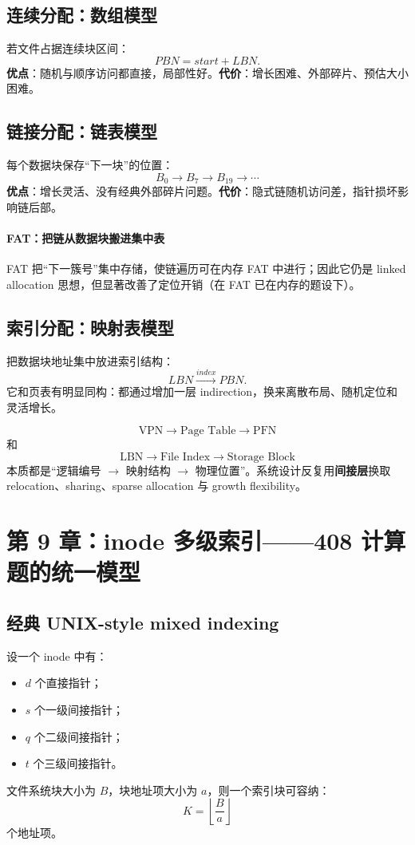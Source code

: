 \documentclass[11pt,a4paper]{ctexart}
\newcommand{\kw}[1]{\textbf{#1}}
\begin{document}
\subsection{连续分配：数组模型}
若文件占据连续块区间：
\[
PBN = start + LBN.
\]
\kw{优点}：随机与顺序访问都直接，局部性好。\kw{代价}：增长困难、外部碎片、预估大小困难。

\subsection{链接分配：链表模型}
每个数据块保存“下一块”的位置：
\[
B_0\to B_7\to B_{19}\to\cdots
\]
\kw{优点}：增长灵活、没有经典外部碎片问题。\kw{代价}：隐式链随机访问差，指针损坏影响链后部。

\paragraph{FAT：把链从数据块搬进集中表}
FAT 把“下一簇号”集中存储，使链遍历可在内存 FAT 中进行；因此它仍是 linked allocation 思想，但显著改善了定位开销（在 FAT 已在内存的题设下）。

\subsection{索引分配：映射表模型}
把数据块地址集中放进索引结构：
\[
LBN\xrightarrow{index}PBN.
\]
它和页表有明显同构：都通过增加一层 indirection，换来离散布局、随机定位和灵活增长。

\begin{bridge}
\[
\text{VPN}\to\text{Page Table}\to\text{PFN}
\]
和
\[
\text{LBN}\to\text{File Index}\to\text{Storage Block}
\]
本质都是“逻辑编号 $\to$ 映射结构 $\to$ 物理位置”。系统设计反复用\kw{间接层}换取 relocation、sharing、sparse allocation 与 growth flexibility。
\end{bridge}

\section{第 9 章：inode 多级索引——408 计算题的统一模型}

\subsection{经典 UNIX-style mixed indexing}
设一个 inode 中有：
\begin{itemize}
  \item $d$ 个直接指针；
  \item $s$ 个一级间接指针；
  \item $q$ 个二级间接指针；
  \item $t$ 个三级间接指针。
\end{itemize}
文件系统块大小为 $B$，块地址项大小为 $a$，则一个索引块可容纳：
\[
\boxed{K=\left\lfloor\frac{B}{a}\right\rfloor}
\]
个地址项。
\end{document}
